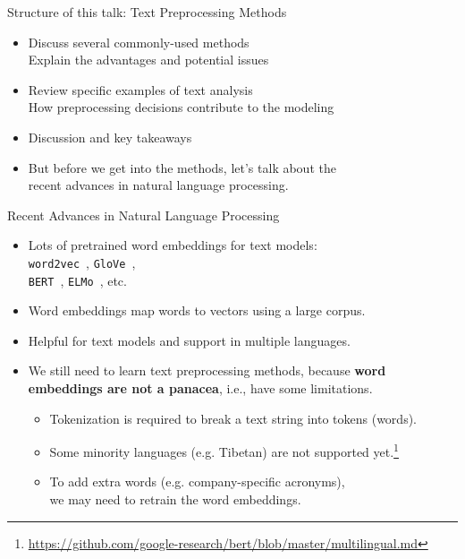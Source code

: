 \documentclass{beamer}
\renewcommand{\cite}{\citep}
\begin{document}
\begin{frame}{Structure of this talk: Text Preprocessing Methods}
\begin{itemize}
\item Discuss several commonly-used methods\\
	Explain the advantages and potential issues
\item Review specific examples of text analysis\\
	How preprocessing decisions contribute to the modeling
\item Discussion and key takeaways %
	\bigskip
\item But before we get into the methods, let's talk about the\\ 
	recent advances in natural language processing.
\end{itemize}
\end{frame}

\begin{frame}{Recent Advances in Natural Language Processing}
\begin{itemize}
\item Lots of pretrained word embeddings for text models:\\
\texttt{word2vec}~\cite{mikolov2013efficient}, \texttt{GloVe}~\cite{pennington2014glove}, \\
\texttt{BERT}~\cite{devlin2018bert}, \texttt{ELMo}~\cite{peters2018deep}, etc.
\item Word embeddings map words to vectors using a large corpus.
\item Helpful for text models and support in multiple languages.
	\bigskip
\item We still need to learn text preprocessing methods, because \textbf{word embeddings are not a panacea}, i.e., have some limitations.
	\begin{itemize}
	\item Tokenization is required to break a text string into tokens (words).
	\item Some minority languages (e.g. Tibetan) are not supported yet.\footnote{\url{https://github.com/google-research/bert/blob/master/multilingual.md}}
	\item To add extra words (e.g. company-specific acronyms),\\ 
	we may need to retrain the word embeddings.~\cite{wilson2020urban}
	\end{itemize}
\end{itemize}
\end{frame}
\end{document}
